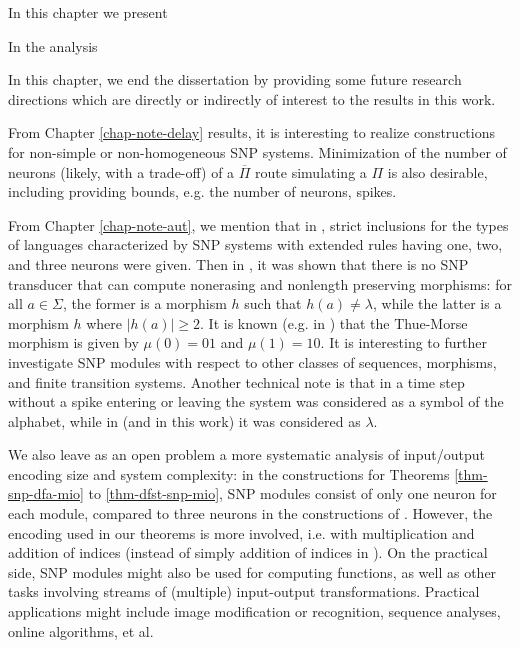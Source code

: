 In this chapter we present 

In the analysis 




In this chapter, we end the dissertation by providing some future research directions which are directly or indirectly of interest to the results in this work.


From Chapter \ref{chap-note-delay} results, it is interesting to realize constructions for non-simple or non-homogeneous SNP systems. %
Minimization of the number of neurons (likely, with a trade-off) of a $ \overline{\Pi}$ route simulating a $\Pi$ is also desirable, including providing bounds, e.g. the number of neurons, spikes. 


From Chapter \ref{chap-note-aut}, we mention that in \cite{chen2008}, strict inclusions for the types of languages characterized by SNP systems with extended rules having one, two, and three neurons were given. 
Then in \cite{snpmorph}, it was shown that there is no SNP transducer that can compute nonerasing  and nonlength preserving morphisms: for all $a \in \Sigma$, the former is a morphism $h$ such that $h(a) \neq \lambda$, while the latter is a morphism $h$ where $|h(a)| \geq 2$. 
It is known (e.g. in \cite{allshall}) that the Thue-Morse morphism is given by $\mu(0) = 01$ and $\mu(1) = 10$. 
It is interesting to further investigate SNP modules with respect to other classes of sequences, morphisms, and finite transition systems. 
Another technical note is that in \cite{snpmorph} a time step without a spike entering or leaving the system was considered as a symbol of the alphabet, while in \cite{ibarra-on-snp} (and in this work) it was considered as $\lambda$. 

We also leave as an open problem a more systematic analysis of input/output encoding size and system complexity: in the constructions for Theorems \ref{thm-snp-dfa-mio} to \ref{thm-dfst-snp-mio}, SNP modules consist of only one neuron for each module, compared to three neurons in the constructions of \cite{ibarra-on-snp}. However, the encoding used in our theorems is more involved, i.e. with multiplication and addition of indices (instead of simply addition of indices in \cite{ibarra-on-snp}).
On the practical side, SNP modules might also be used for computing functions, as well as other tasks involving streams of (multiple) input-output transformations.
Practical applications might include image modification or recognition, sequence analyses, online algorithms, et al.

